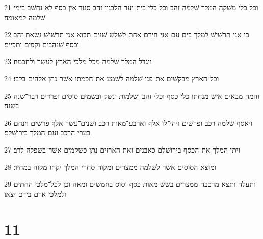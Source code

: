 \par 21 וכל כלי משׁקה המלך שׁלמה זהב וכל כלי בית־יער הלבנון זהב סגור אין כסף לא נחשׁב בימי שׁלמה למאומה׃
\par 22 כי אני תרשׁישׁ למלך בים עם אני חירם אחת לשׁלשׁ שׁנים תבוא אני תרשׁישׁ נשׂאת זהב וכסף שׁנהבים וקפים ותכיים׃
\par 23 ויגדל המלך שׁלמה מכל מלכי הארץ לעשׁר ולחכמה׃
\par 24 וכל־הארץ מבקשׁים את־פני שׁלמה לשׁמע את־חכמתו אשׁר־נתן אלהים בלבו׃
\par 25 והמה מבאים אישׁ מנחתו כלי כסף וכלי זהב ושׂלמות ונשׁק ובשׂמים סוסים ופרדים דבר־שׁנה בשׁנה׃
\par 26 ויאסף שׁלמה רכב ופרשׁים ויהי־לו אלף וארבע־מאות רכב ושׁנים־עשׂר אלף פרשׁים וינחם בערי הרכב ועם־המלך בירושׁלם׃
\par 27 ויתן המלך את־הכסף בירושׁלם כאבנים ואת הארזים נתן כשׁקמים אשׁר־בשׁפלה לרב׃
\par 28 ומוצא הסוסים אשׁר לשׁלמה ממצרים ומקוה סחרי המלך יקחו מקוה במחיר׃
\par 29 ותעלה ותצא מרכבה ממצרים בשׁשׁ מאות כסף וסוס בחמשׁים ומאה וכן לכל־מלכי החתים ולמלכי ארם בידם יצאו׃

\chapter{11}

